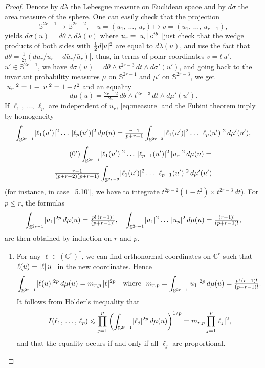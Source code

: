 \documentclass[10pt,a4paper]{article}
\DeclarePairedDelimiter{\abs}{\lvert}{\rvert}
\newcommand*\bC{\mathbb{C}}
\newcommand*\bS{\mathbb{S}}
\newcommand*\bB{\mathbb{B}}
\let\leq\leqslant
\numberwithin{equation}{section}
\begin{document}
\begin{proof}
Denote by $d\lambda$ the Lebesgue measure on Euclidean space and by $d\sigma$ the area measure of the sphere. One can easily check that the projection
\[
\bS^{2r-1}\to \bB^{2r-2},\quad u=\left(u_1,\,\dotsc,\,u_r\right)\mapsto v=\left(u_1,\,\dotsc,\,u_{r-1}\right),
\]
yields $d\sigma(u)=d\theta\wedge d\lambda(v)$ where $u_r=\abs{u_r}\,e^{i\theta}$ [just check that the wedge products of both sides with $\tfrac{1}{ 2}d\abs{u}^2$ are equal to $d\lambda(u)$, and use the fact that $d\theta=\tfrac{1}{ 2i}(du_r/u_r -d\bar u_r/\bar u_r)$], thus, in terms of polar coordinates $v=t\,u'$, $u'\in\bS^{2r-1}$, we have
$d\sigma(u)=d\theta\wedge t^{2r-3}\,dt\wedge d\sigma'(u')$, and going back to the invariant probability measures $\mu$ on $\bS^{2r-1}$ and $\mu'$ on $\bS^{2r-3}$, we get
$\abs{u_r}^2=1-\abs{v}^2=1-t^2$ and an equality
\begin{equation}\label{eq:measure}
d\mu(u)=\tfrac{2r-2}{ 2\pi}\,d\theta\wedge t^{2r-3}\,dt
\wedge d\mu'(u').
\end{equation}
If $\ell_1,\,\dotsc,\,\ell_p$ are independent of $u_r$, \eqref{eq:measure} and the Fubini theorem imply by homogeneity
\begin{align}\label{5.10}
\int_{\bS^{2r-1}}\abs{\ell_1(u')}^2\ldots\,\abs{\ell_p(u')}^2\,d\mu(u) =
\tfrac{r-1}{p+r-1}
\int_{\bS^{2r-3}}\abs{\ell_1(u')}^2\ldots\,\abs{\ell_p(u')}^2\,d\mu'(u'),
\end{align}
\begin{multline}\label{5.10'}
\tag{\theequation\ensuremath{'}}
\int_{\bS^{2r-1}}\abs{\ell_1(u')}^2\ldots\,\abs{\ell_{p-1}(u')}^2\,\abs{u_r}^2\,d\mu(u) =
\\
\tfrac{r-1}{(p+r-2)(p+r-1)} \int_{\bS^{2r-3}}\abs{\ell_1(u')}^2\ldots\,\abs{\ell_{p-1}(u')}^2\,d\mu'(u')
\end{multline}
(for instance, in case~\eqref{5.10'}, we have to integrate $t^{2p-2}(1-t^2)\times t^{2r-3}\,dt$). For $p\leq r$, the formulas
\[
\int_{\bS^{2r-1}}\abs{u_1}^{2p}\,d\mu(u)=\tfrac{p!\,(r-1)!}{ (p+r-1)!},\quad
\int_{\bS^{2r-1}}\abs{u_1}^2\ldots\,\abs{u_p}^2\,d\mu(u)=\tfrac{(r-1)!}{ (p+r-1)!},
\]
are then obtained by induction on $r$ and $p$.
\begin{enumerate}
\item For any $\ell\in(\bC^r)^*$, we can find orthonormal coordinates on $\bC^r$ such that $\ell(u)=\abs{\ell}\,u_1$ in the new coordinates. Hence
\[
\int_{\bS^{2r-1}}\abs{\ell(u)}^{2p}\,d\mu(u)=m_{r,p}\,\abs{\ell}^{2p}\quad
\text{where}~~m_{r,p}=\int_{\bS^{2r-1}}\abs{u_1}^{2p}\,d\mu(u)=
\tfrac{p!\,(r-1)!}{ (p+r-1)!}.
\]
It follows from H\"older's inequality that
\[
I(\ell_1,\,\dotsc,\,\ell_p)\leq \prod_{j=1}^p
\left(\int_{\bS^{2r-1}}\abs{\ell_j}^{2p}\,d\mu(u)\right)^{1/p}=m_{r,p}
\prod_{j=1}^p\abs{\ell_j}^2,
\]
and that the equality occurs if and only if all $\ell_j$ are proportional.


\end{enumerate}
\end{proof}
\end{document}
